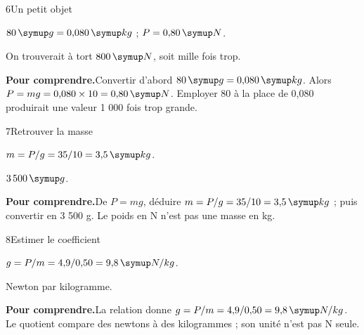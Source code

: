 \par\noindent\begin{minipage}{\linewidth}
\begin{corrige}{6}{Un petit objet}
\begin{questions}
\item $80\unite g=0{,}080\unite{kg}$ ; $P=0{,}80\unite N$.
\item On trouverait à tort $800\unite N$, soit mille fois trop.
\end{questions}
\par\smallskip\noindent\textbf{Pour comprendre.}\enspace Convertir d’abord $80\unite g=0{,}080\unite{kg}$. Alors $P=mg=0{,}080\times10=0{,}80\unite N$. Employer 80 à la place de 0,080 produirait une valeur 1 000 fois trop grande.\par
\end{corrige}
\end{minipage}
\par\noindent\begin{minipage}{\linewidth}
\begin{corrige}{7}{Retrouver la masse}
\begin{questions}
\item $m=P/g=35/10=3{,}5\unite{kg}$.
\item $3\,500\unite g$.
\end{questions}
\par\smallskip\noindent\textbf{Pour comprendre.}\enspace De $P=mg$, déduire $m=P/g=35/10=3{,}5\unite{kg}$ ; puis convertir en 3 500 g. Le poids en N n’est pas une masse en kg.\par
\end{corrige}
\end{minipage}
\par\noindent\begin{minipage}{\linewidth}
\begin{corrige}{8}{Estimer le coefficient}
\begin{questions}
\item $g=P/m=4{,}9/0{,}50=9{,}8\unite{N/kg}$.
\item Newton par kilogramme.
\end{questions}
\par\smallskip\noindent\textbf{Pour comprendre.}\enspace La relation donne $g=P/m=4{,}9/0{,}50=9{,}8\unite{N/kg}$. Le quotient compare des newtons à des kilogrammes ; son unité n’est pas N seule.\par
\end{corrige}
\end{minipage}
